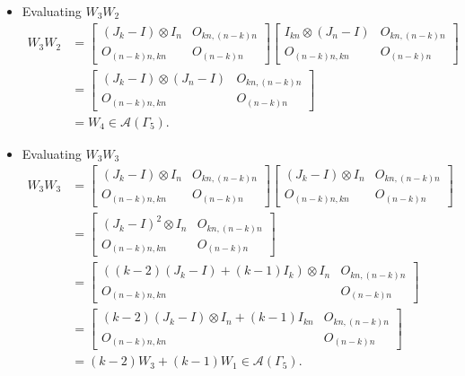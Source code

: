 \begin{itemize}
\item Evaluating $W_{3}W_{2}$
\begin{align*}
W_3W_2 &=
\begin{bmatrix}
(J_k - I) \otimes I_n & O_{kn, (n-k)n} \\
O_{(n-k)n,kn} & O_{(n-k)n}
\end{bmatrix}
\begin{bmatrix}
I_{kn} \otimes (J_n-I) & O_{kn, (n-k)n} \\
O_{(n-k)n,kn} & O_{(n-k)n}
\end{bmatrix}\\
&= \begin{bmatrix}
(J_k - I) \otimes (J_n-I) & O_{kn, (n-k)n} \\
O_{(n-k)n,kn} & O_{(n-k)n}
\end{bmatrix}\\
&= W_4\in\mathcal{A}(\Gamma_5).
\end{align*}

\item Evaluating $W_{3}W_{3}$
\begin{align*}
W_3W_3 &=
\begin{bmatrix}
(J_k - I) \otimes I_n & O_{kn, (n-k)n} \\
O_{(n-k)n,kn} & O_{(n-k)n}
\end{bmatrix}
\begin{bmatrix}
(J_k - I) \otimes I_n & O_{kn, (n-k)n} \\
O_{(n-k)n,kn} & O_{(n-k)n}
\end{bmatrix}\\
&= \begin{bmatrix}
(J_k - I)^2 \otimes I_n & O_{kn, (n-k)n} \\
O_{(n-k)n,kn} & O_{(n-k)n}
\end{bmatrix}\\
&= \begin{bmatrix}
((k-2)(J_k - I)+(k-1)I_k) \otimes I_n & O_{kn, (n-k)n} \\
O_{(n-k)n,kn} & O_{(n-k)n}
\end{bmatrix}\\
&= \begin{bmatrix}
(k-2)(J_k - I)\otimes I_n + (k-1)I_{kn} & O_{kn, (n-k)n} \\
O_{(n-k)n,kn} & O_{(n-k)n}
\end{bmatrix}\\
&= (k-2)W_3 + (k-1)W_1\in\mathcal{A}(\Gamma_5).
\end{align*}


\end{itemize}
